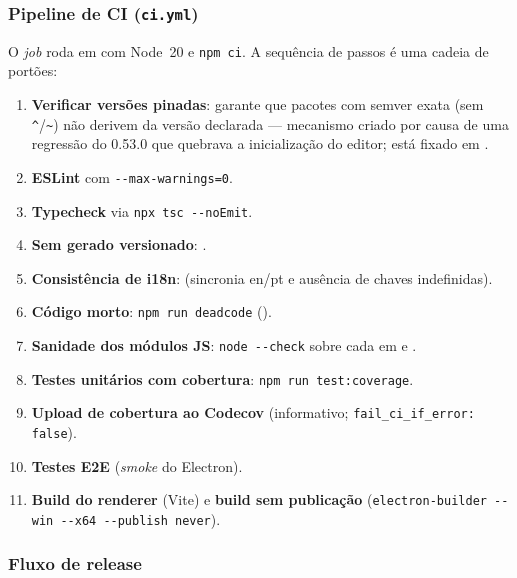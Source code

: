 \subsubsection{Pipeline de CI (\texttt{ci.yml})}

O \emph{job}  roda em  com Node~20 e
\lstinline|npm ci|. A sequência de passos é uma cadeia de portões:

\begin{enumerate}[nosep]
  \item \textbf{Verificar versões pinadas}: 
        garante que pacotes com semver exata (sem \texttt{\textasciicircum}/\texttt{\textasciitilde})
        não derivem da versão declarada --- mecanismo criado por causa de uma
        regressão do  0.53.0 que quebrava a inicialização do
        editor;  está fixado em .
  \item \textbf{ESLint} com \lstinline|--max-warnings=0|.
  \item \textbf{Typecheck} via \lstinline|npx tsc --noEmit|.
  \item \textbf{Sem  gerado versionado}: .
  \item \textbf{Consistência de i18n}:  (sincronia
        en/pt e ausência de chaves indefinidas).
  \item \textbf{Código morto}: \lstinline|npm run deadcode| ().
  \item \textbf{Sanidade dos módulos JS}: \lstinline|node --check| sobre cada
         em  e .
  \item \textbf{Testes unitários com cobertura}: \lstinline|npm run test:coverage|.
  \item \textbf{Upload de cobertura ao Codecov} (informativo;
        \lstinline|fail_ci_if_error: false|).
  \item \textbf{Testes E2E} (\emph{smoke} do Electron).
  \item \textbf{Build do renderer} (Vite) e \textbf{build sem publicação}
        (\lstinline|electron-builder --win --x64 --publish never|).
\end{enumerate}

\subsubsection{Fluxo de release}

